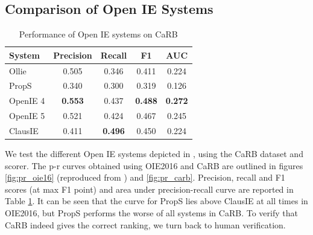     \subsection{Comparison of Open IE Systems}
        \begin{table}[h!]
        \centering
        \begin{tabular}{|l|c|c|c|c|}
        \hline
        System  & Precision & Recall & F1 & AUC  \\ \hline
        
        Ollie       & 0.505          & 0.346          & 0.411 & 0.224 \\ %
        PropS       & 0.340          & 0.300          & 0.319 & 0.126 \\ %
        OpenIE 4    & {\bf 0.553}    & 0.437          & \bf{0.488} & \bf{0.272}\\ %
        OpenIE 5    & 0.521          & 0.424          & 0.467 & 0.245\\ %
        ClausIE     & 0.411          & \bf{0.496}     & 0.450 & 0.224\\ \hline
        \end{tabular}
        \vspace*{-1ex}
        \caption{Performance of Open IE systems on CaRB}
        \vspace*{-2ex}
        \label{tab:carb}
        \end{table}

        We test the different Open IE systems depicted in \citet{OIE2016}, using the CaRB dataset and scorer. The p-r curves obtained using OIE2016 and CaRB are outlined in figures \ref{fig:pr_oie16} (reproduced from \citet{Rnnoie}) and \ref{fig:pr_carb}. Precision, recall and F1 scores (at max F1 point) and area under precision-recall curve are reported in Table \ref{tab:carb}. It can be seen that the curve for PropS lies above ClausIE at all times in OIE2016, but PropS performs the worse of all systems in CaRB. To verify that CaRB indeed gives the correct ranking, we turn back to human verification.

